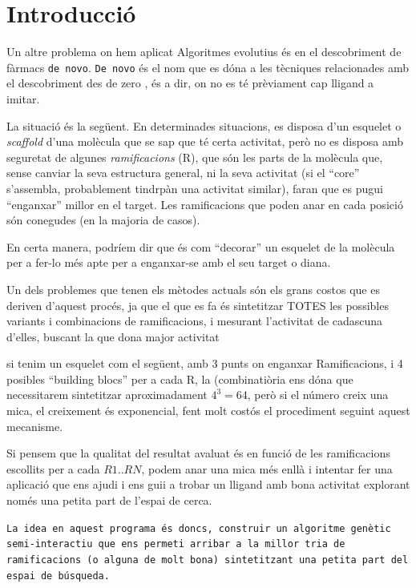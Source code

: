 \documentclass[titlepage,a4paper,12pt]{book}
\begin{document}
\tableofcontents
\section{Introducció} %
	\label{sec:Introduccio}
	Un altre problema on hem aplicat Algoritmes evolutius és en el descobriment
	de fàrmacs \texttt{de novo}.  \texttt{De novo} és el nom que es dóna a les
	tècniques relacionades amb el descobriment des de zero , és a dir, on no es té
	prèviament cap lligand a imitar.

	La situació és la següent.  En determinades situacions, es disposa d'un
	esquelet o \textit{scaffold} d'una molècula que se sap que té certa
	activitat, però no es disposa amb seguretat de algunes
	\textit{ramificacions} (R), que són les parts de la molècula que, sense
	canviar la seva estructura general, ni la seva activitat (si el ``core''
	s'assembla, probablement tindrpàn una activitat similar), faran que es pugui
	``enganxar'' millor en el target.  Les ramificacions que poden anar en cada
	posició són conegudes (en la majoria de casos).

	En certa manera, podríem dir que és com ``decorar'' un esquelet de la
	molècula per a fer-lo més apte per a enganxar-se amb el seu target o diana.

	Un dels problemes que tenen els mètodes actuals són els grans costos
	que es deriven d'aquest procés, ja que el que es fa és sintetitzar TOTES les
	possibles variants i combinacions de ramificacions, i mesurant l'activitat
	de cadascuna d'elles, buscant la que dona major activitat

	si tenim un esquelet com el següent, amb 3 punts on enganxar Ramificacions,
	i 4 posibles ``building blocs'' per a cada R, la (combinatiòria ens dóna que
	necessitarem sintetitzar aproximadament $4^3 = 64 $, però si el número creix
	una mica, el creixement és exponencial, fent molt costós el procediment
	seguint aquest mecanisme.

	Si pensem que la qualitat del resultat avaluat és en funció de les
	ramificacions escollits per a cada $R1..RN$, podem anar una mica més enllà i
	intentar fer una aplicació que ens ajudi i ens guii a trobar un lligand amb
	bona activitat explorant només una petita part de l'espai de cerca.
	
	\texttt{La idea en aquest programa és doncs, construir un algoritme genètic
	semi-interactiu que ens permeti arribar a la millor tria de ramificacions (o
	alguna de molt bona) sintetitzant una petita part del espai de búsqueda.}
\end{document}
